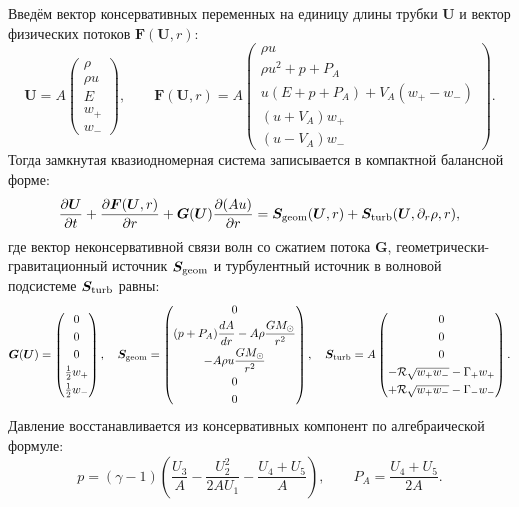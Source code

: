 \documentclass[11pt,a4paper]{article}
\begin{document}
Введём вектор консервативных переменных на единицу длины трубки $\bm{U}$ и вектор физических потоков $\bm{F}(\bm{U}, r)$:
\begin{equation}
\bm{U} = A\begin{pmatrix}
\rho \\[3pt]
\rho u \\[3pt]
E \\[3pt]
w_+ \\[3pt]
w_-
\end{pmatrix}, \qquad
\bm{F}(\bm{U}, r) = A\begin{pmatrix}
\rho u \\[3pt]
\rho u^2 + p + P_A \\[3pt]
u(E + p + P_A) + V_A(w_+ - w_-) \\[3pt]
(u + V_A)w_+ \\[3pt]
(u - V_A)w_-
\end{pmatrix}.
\label{eq:cons_vectors}
\end{equation}
Тогда замкнутая квазиодномерная система записывается в компактной балансной форме:
\begin{equation}
\frac{\partial\bm{U}}{\partial t} + \frac{\partial\bm{F}(\bm{U}, r)}{\partial r} + \bm{G}(\bm{U})\frac{\partial(Au)}{\partial r} = \bm{S}_{\rm geom}(\bm{U}, r) + \bm{S}_{\rm turb}(\bm{U}, \partial_r\rho, r),
\label{eq:master_system}
\end{equation}
где вектор неконсервативной связи волн со сжатием потока $\bm{G}$, геометрически-гравитационный источник $\bm{S}_{\rm geom}$ и турбулентный источник в волновой подсистеме $\bm{S}_{\rm turb}$ равны:
\begin{equation}
\bm{G}(\bm{U}) = \begin{pmatrix}
0 \\[3pt]
0 \\[3pt]
0 \\[3pt]
\frac{1}{2}w_+ \\[3pt]
\frac{1}{2}w_-
\end{pmatrix}, \quad
\bm{S}_{\rm geom} = \begin{pmatrix}
0 \\[3pt]
(p + P_A)\dfrac{dA}{dr} - A\rho\dfrac{GM_\odot}{r^2} \\[6pt]
-A\rho u\dfrac{GM_\odot}{r^2} \\[6pt]
0 \\[3pt]
0
\end{pmatrix}, \quad
\bm{S}_{\rm turb} = A\begin{pmatrix}
0 \\[3pt]
0 \\[3pt]
0 \\[3pt]
-\mathcal{R}\sqrt{w_+ w_-} - \Gamma_+ w_+ \\[3pt]
+\mathcal{R}\sqrt{w_+ w_-} - \Gamma_- w_-
\end{pmatrix}.
\label{eq:source_vectors}
\end{equation}
Давление восстанавливается из консервативных компонент по алгебраической формуле:
\begin{equation}
p = (\gamma - 1)\left(\frac{U_3}{A} - \frac{U_2^2}{2 A U_1} - \frac{U_4 + U_5}{A}\right), \qquad P_A = \frac{U_4 + U_5}{2A}.
\label{eq:pressure_recovery}
\end{equation}
\end{document}
